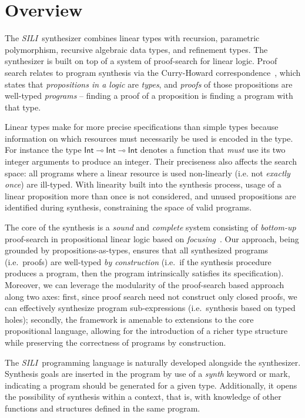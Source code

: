 \documentclass{llncs}
\newcommand{\lolli}{\multimap}
\newcommand{\synname}{\emph{SILI}}
\begin{document}
\section{Overview}\label{sec:overview}

The \synname\ synthesizer combines linear types with recursion,
parametric polymorphism, recursive algebraic data types, and
refinement types. The synthesizer is built on top of a system of proof-search for
linear logic. Proof search relates to program synthesis via the Curry-Howard
correspondence~\cite{curry:34,howard:80,DBLP:journals/cacm/Wadler15}, which states that \emph{propositions in a logic} are
\emph{types}, and \emph{proofs} of those propositions are well-typed
\emph{programs} -- finding a proof of a proposition is finding a program with
that type.

Linear types make for more precise specifications than simple types
because information on which resources must necessarily be used is
encoded in the type. For instance the type $\mathsf{Int} \lolli
\mathsf{Int} \lolli \mathsf{Int}$ denotes a function that \emph{must}
use its two integer arguments to produce an integer.
Their preciseness also affects the search space:
all programs where a linear resource is used non-linearly (i.e. not
\emph{exactly once}) are ill-typed. With linearity built into the
synthesis process, usage of a linear proposition more than once is not
considered, and unused propositions are identified during synthesis,
constraining the space of valid programs.

The core of the synthesis is a \emph{sound} and \emph{complete} system
consisting of \emph{bottom-up} proof-search in propositional linear
logic based on \emph{focusing}~\cite{}. Our approach, being grounded
by propositions-as-types, ensures that all synthesized programs
(i.e.~proofs) are well-typed \emph{by construction} (i.e.~if the
synthesis procedure produces a program, then the program intrinsically
satisfies its specification). Moreover, we can leverage the modularity
of the proof-search based approach along two axes: first, since proof
search need not construct only closed proofs, we can effectively
synthesize program sub-expressions (i.e.~synthesis based on typed
holes); secondly, the framework is amenable to extensions to the core
propositional language, allowing for the introduction of a richer type
structure while preserving the correctness of programs by
construction.

The \synname\ programming language is naturally developed alongside
the synthesizer. Synthesis goals are inserted in the program by use of
a \emph{synth} keyword or mark, indicating a program should be
generated for a given type. Additionally, it opens the possibility of
synthesis within a context, that is, with knowledge of other functions and
structures defined in the same program.
\end{document}
